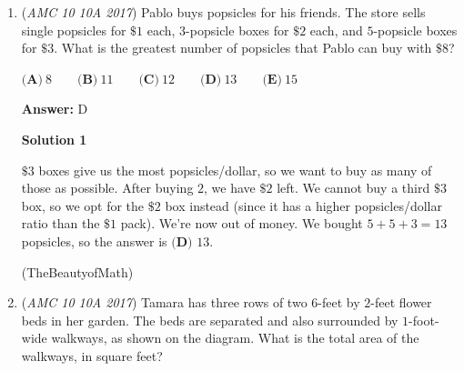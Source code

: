 \begin{enumerate}
$(2(2(2(2(2(2+1)+1)+1)+1)+1)+1)$$=(2(2(2(2(2(3)+1)+1)+1)+1)+1)$$=(2(2(2(2(6+1)+1)+1)+1)+1)$$=(2(2(2(2(7)+1)+1)+1)+1)$$=(2(2(2(14+1)+1)+1)+1)$$=(2(2(2(15)+1)+1)+1)$$=(2(2(30+1)+1)+1)$$=(2(2(31)+1)+1)$$=(2(62+1)+1)$$=(2(63)+1)$$=(126+1)$$=127 \Longrightarrow \boxed{\textbf{(C)}\ 127}$.

 



\textbf{Solution 6 (quickest)}

Notice that $x^6 + x^5 + x^4 + x^3 + x^2 + x + 1 = x (x (x (x (x (x + 1) + 1) + 1) + 1) + 1) + 1$. Substituting $2$ for $x$, we get 
 \[2(2(2(2(2(2+1)+1)+1)+1)+1)+1 = 2^6 + 2^5 + 2^4 + 2^3 + 2^2 + 2 + 1 = 2^7 - 1 \Longrightarrow \boxed{\textbf{(C)}\ 127}\]




\textbf{Solution 7 (Fast)}

Notice that there are 5 instances where the sum is multiplied by $2$. That gives us $2^5 = 32$. Separate the addition part into $3$ and the $1$. Multiply the $3$ by $32$, giving $96$. Then notice that the $1$ is multiplied by increasing powers of two; therefore, it is equal to $2^5-1$. Then add these two parts. $96+31=\boxed{\textbf{(C)}\ 127}$



	\item (\textit{AMC 10 10A 2017}) Pablo buys popsicles for his friends. The store sells single popsicles for $\$1$ each, $3$-popsicle boxes for $\$2$ each, and $5$-popsicle boxes for $\$3$. What is the greatest number of popsicles that Pablo can buy with $\$8$?


 $\textbf{(A)}\ 8\qquad\textbf{(B)}\ 11\qquad\textbf{(C)}\ 12\qquad\textbf{(D)}\ 13\qquad\textbf{(E)}\ 15$

 \textbf{Answer: }D



\textbf{Solution 1}

$\$3$ boxes give us the most popsicles/dollar, so we want to buy as many of those as possible. After buying $2$, we have $\$2$ left. We cannot buy a third $\$3$ box, so we opt for the $\$2$ box instead (since it has a higher popsicles/dollar ratio than the $\$1$ pack). We're now out of money. We bought $5+5+3=13$ popsicles, so the answer is $\boxed{\textbf{(D) }13}$.

 (TheBeautyofMath)

 


	\item (\textit{AMC 10 10A 2017}) Tamara has three rows of two $6$-feet by $2$-feet flower beds in her garden. The beds are separated and also surrounded by $1$-foot-wide walkways, as shown on the diagram. What is the total area of the walkways, in square feet?



\end{enumerate}
